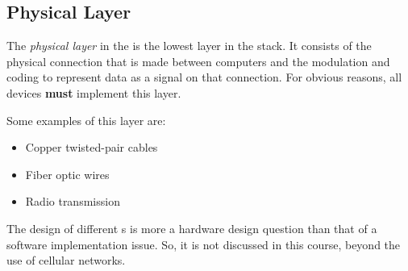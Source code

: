 \subsection{Physical Layer}\label{subsec:Physical_Layer}
\begin{definition}\label{def:Physical_Layer}
  The \emph{physical layer} in the  is the lowest layer in the stack.
  It consists of the physical connection that is made between computers and the modulation and coding to represent data as a signal on that connection.
  For obvious reasons, all devices \textbf{must} implement this layer.

  Some examples of this layer are:
  \begin{itemize}[noitemsep]
  \item Copper twisted-pair cables
  \item Fiber optic wires
  \item Radio transmission
  \end{itemize}

  \begin{remark}
    The design of different s is more a hardware design question than that of a software implementation issue.
    So, it is not discussed in this course, beyond the use of cellular networks.
  \end{remark}
\end{definition}

